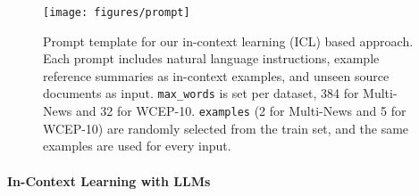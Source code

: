 \documentclass[11pt]{article}
\begin{document}
\begin{figure}[t]
\texttt{[image: figures/prompt]}
\caption{Prompt template for our in-context learning (ICL) based approach. Each prompt includes natural language instructions, example reference summaries as in-context examples, and unseen source documents as input. \texttt{max\_words} is set per dataset, 384 for Multi-News and 32 for WCEP-10. \texttt{examples} (2 for Multi-News and 5 for WCEP-10) are randomly selected from the train set, and the same examples are used for every input.}
\label{fig:prompt}
\vspace{-3.5mm}
\end{figure}

\paragraph{In-Context Learning with LLMs}
\end{document}

